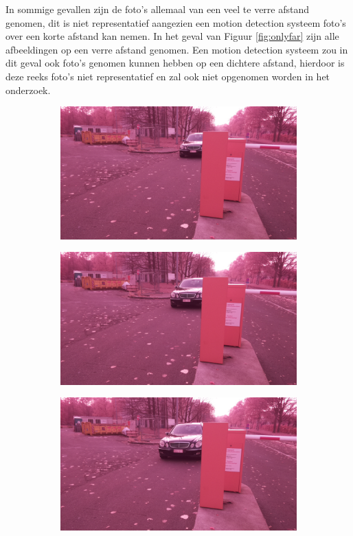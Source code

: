In sommige gevallen zijn de foto's allemaal van een veel te verre afstand genomen, dit is niet representatief aangezien een motion detection systeem foto's over een korte afstand kan nemen. In het geval van Figuur \ref{fig:onlyfar} zijn alle afbeeldingen op een verre afstand genomen. Een motion detection systeem zou in dit geval ook foto's genomen kunnen hebben op een dichtere afstand, hierdoor is deze reeks foto's niet representatief en zal ook niet opgenomen worden in het onderzoek.
\begin{figure}[h!]
	\centering
	\begin{subfigure}[b]{0.45\linewidth}
		\includegraphics[width=\linewidth]{img/slecht/onlyfar1.jpg}
	\end{subfigure}
	\begin{subfigure}[b]{0.45\linewidth}
		\includegraphics[width=\linewidth]{img/slecht/onlyfar2.jpg}
	\end{subfigure}
	\begin{subfigure}[b]{0.45\linewidth}
		\includegraphics[width=\linewidth]{img/slecht/onlyfar3.jpg}

\end{subfigure}
\end{figure}
